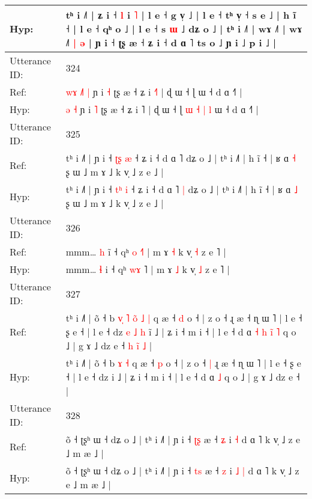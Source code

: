 \documentclass[10pt]{article}
\DeclareRobustCommand{\hl}[1]{{\textcolor{red}{#1}}}
\begin{document}
\begin{longtable}{ll}
 \\
Hyp: & tʰ i ˩˥ | ʑ i ˧ \hl{l} i \hl{˥} | l e ˧ g v̩ ˩ | l e ˧ tʰ v̩ ˧ s e ˩ | h ĩ ˧ | l e ˧ qʰ o ˩ | l e ˧ s \hl{ɯ} ˩ dʑ o ˩ | tʰ i ˩˥ | wɤ ˩˥ | wɤ ˩˥\hl{ }\hl{|}\hl{ }\hl{ə} | ɲ i ˧ ʈʂ æ ˧ ʑ i ˧ d ɑ ˥ ts o ˩ ɲ i ˩ p i ˩ |
 \\
\midrule
Utterance ID: & 324 \\
Ref: & \hl{w}\hl{ɤ}\hl{ }\hl{˩}\hl{˥} \hl{|} ɲ i \hl{˧} ʈʂ æ ˧ ʑ i \hl{˧}˥ | ɖ ɯ ˧ ɭ\hl{}\hl{}\hl{}\hl{}\hl{}\hl{}\hl{}\hl{} ɯ ˧ d ɑ ˧˥ |
 \\
Hyp: & \hl{}\hl{}\hl{}\hl{}\hl{ə} \hl{˧} ɲ i \hl{˥} ʈʂ æ ˧ ʑ i \hl{}˥ | ɖ ɯ ˧ ɭ\hl{ }\hl{ɯ}\hl{ }\hl{˧}\hl{ }\hl{|}\hl{ }\hl{l} ɯ ˧ d ɑ ˧˥ |
 \\
\midrule
Utterance ID: & 325 \\
Ref: & tʰ i ˩˥ | ɲ i ˧ \hl{ʈ}\hl{ʂ} \hl{æ} ˧ ʑ i ˧ d ɑ ˥\hl{}\hl{} dʑ o ˩ | tʰ i ˩˥ | h ĩ ˧ | ʁ ɑ \hl{˧} ʂ ɯ ˩ m ɤ ˩ k v̩ ˩ z e ˩ |
 \\
Hyp: & tʰ i ˩˥ | ɲ i ˧ \hl{t}\hl{ʰ} \hl{i} ˧ ʑ i ˧ d ɑ ˥\hl{ }\hl{|} dʑ o ˩ | tʰ i ˩˥ | h ĩ ˧ | ʁ ɑ \hl{˩} ʂ ɯ ˩ m ɤ ˩ k v̩ ˩ z e ˩ |
 \\
\midrule
Utterance ID: & 326 \\
Ref: & mmm… \hl{h} i\hl{̃} ˧ qʰ \hl{o}\hl{ }\hl{˧}˥ | m ɤ \hl{˧} k v̩ \hl{˧} z e ˥ |
 \\
Hyp: & mmm… \hl{ɬ} i\hl{} ˧ qʰ \hl{w}\hl{ɤ}\hl{ }˥ | m ɤ \hl{˩} k v̩ \hl{˩} z e ˥ |
 \\
\midrule
Utterance ID: & 327 \\
Ref: & tʰ i ˩˥ | õ ˧ b\hl{ }\hl{v}\hl{̩}\hl{ }\hl{˥}\hl{ }\hl{o}\hl{̃} \hl{˩} \hl{|} q æ ˧ \hl{d} o ˧ | z o ˧\hl{}\hl{} ɻ æ ˧ ɳ ɯ ˥ | l e ˧ ʂ e ˧ | l e ˧ dz\hl{ }\hl{e}\hl{ }\hl{˩}\hl{ }\hl{h} i\hl{̃} ˩ | ʑ i ˧ m i ˧ | l e ˧ d ɑ\hl{ }\hl{˧}\hl{ }\hl{h}\hl{ }\hl{i}\hl{̃} \hl{˥} q o ˩ | g ɤ ˩ dz e ˧\hl{ }\hl{h}\hl{ }\hl{i}\hl{̃}\hl{ }\hl{˩} |
 \\
Hyp: & tʰ i ˩˥ | õ ˧ b\hl{}\hl{}\hl{}\hl{}\hl{}\hl{}\hl{}\hl{} \hl{ɤ} \hl{˧} q æ ˧ \hl{p} o ˧ | z o ˧\hl{ }\hl{|} ɻ æ ˧ ɳ ɯ ˥ | l e ˧ ʂ e ˧ | l e ˧ dz\hl{}\hl{}\hl{}\hl{}\hl{}\hl{} i\hl{} ˩ | ʑ i ˧ m i ˧ | l e ˧ d ɑ\hl{}\hl{}\hl{}\hl{}\hl{}\hl{}\hl{} \hl{˩} q o ˩ | g ɤ ˩ dz e ˧\hl{}\hl{}\hl{}\hl{}\hl{}\hl{}\hl{} |
 \\
\midrule
Utterance ID: & 328 \\
Ref: & õ ˧ ʈʂʰ ɯ ˧ dʑ o ˩ | tʰ i ˩˥ | ɲ i ˧ \hl{ʈ}\hl{ʂ} æ ˧ \hl{ʑ} i\hl{}\hl{} \hl{˧} d ɑ ˥ k v̩ ˩ z e ˩ m æ ˩ |
 \\
Hyp: & õ ˧ ʈʂʰ ɯ ˧ dʑ o ˩ | tʰ i ˩˥ | ɲ i ˧ \hl{t}\hl{s} æ ˧ \hl{z} i\hl{ }\hl{˩} \hl{|} d ɑ ˥ k v̩ ˩ z e ˩ m æ ˩ |

\end{longtable}
\end{document}
